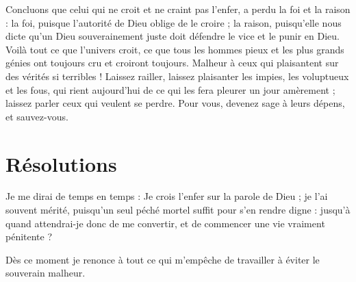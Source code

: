 \documentclass[instructions.tex]{subfiles}
\begin{document}
Concluons que celui qui ne croit et ne craint pas l’enfer, a perdu la foi et la raison : la foi, puisque l’autorité de Dieu oblige de le croire ; la raison, puisqu’elle nous dicte qu’un Dieu souverainement juste doit défendre le vice et le punir en Dieu. Voilà tout ce que l’univers croit, ce que tous les hommes pieux et les plus grands génies ont toujours cru et croiront toujours. Malheur à ceux qui plaisantent sur des vérités si terribles ! Laissez railler, laissez plaisanter les impies, les voluptueux et les fous, qui rient aujourd’hui de ce qui les fera pleurer un jour amèrement ; laissez parler ceux qui veulent se perdre. Pour vous, devenez sage à leurs dépens, et sauvez-vous.
 
\section{Résolutions}
 
\primo Je me dirai de temps en temps : Je crois l’enfer sur la parole de Dieu ; je l’ai souvent mérité, puisqu’un seul péché mortel suffit pour s’en rendre digne : jusqu’à quand attendrai-je donc de me convertir, et de commencer une vie vraiment pénitente ? 

\secundo Dès ce moment je renonce à tout ce qui m’empêche de travailler à éviter le souverain malheur. 

 
\end{document}
